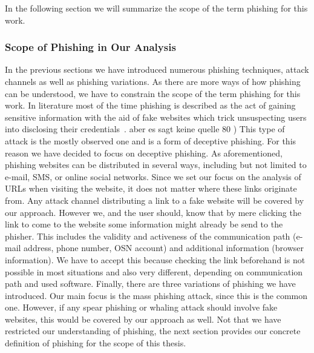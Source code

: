  In the following section we will summarize the scope of the term phishing for this work.

\subsubsection{Scope of Phishing in Our Analysis}
\label{s:scope}
In the previous sections we have introduced numerous phishing techniques, attack channels as well as phishing variations.
 As there are more ways of how phishing can be understood, we have to constrain the scope of the term phishing for this work.
 In literature most of the time phishing is described as the act of gaining sensitive information with the aid of fake websites which trick unsuspecting users into disclosing their credentials~\cite{sheng2007antiphishingphil, antiphishingtrendreport2013, kasperskyreport2013}.
 aber es sagt keine quelle 80 %
)
This type of attack is the mostly observed one and is a form of deceptive phishing.
 For this reason we have decided to focus on deceptive phishing.
 As aforementioned, phishing websites can be distributed in several ways, including but not limited to e-mail, SMS, or online social networks.
 Since we set our focus on the analysis of URLs when visiting the website, it does not matter where these links originate from.
 Any attack channel distributing a link to a fake website will be covered by our approach.
 However we, and the user should, know that by mere clicking the link to come to the website some information might already be send to the phisher.
 This includes the validity and activeness of the communication path (e-mail address, phone number, OSN account) and additional information (browser information). We have to accept this because checking the link beforehand is not possible in most situations and also very different, depending on communication path and used software.
  Finally, there are three variations of phishing we have introduced.
 Our main focus is the mass phishing attack, since this is the common one.
 However, if any spear phishing or whaling attack should involve fake websites, this would be covered by our approach as well.
Not that we have restricted our understanding of phishing, the next section provides our concrete definition of phishing for the scope of this thesis.

